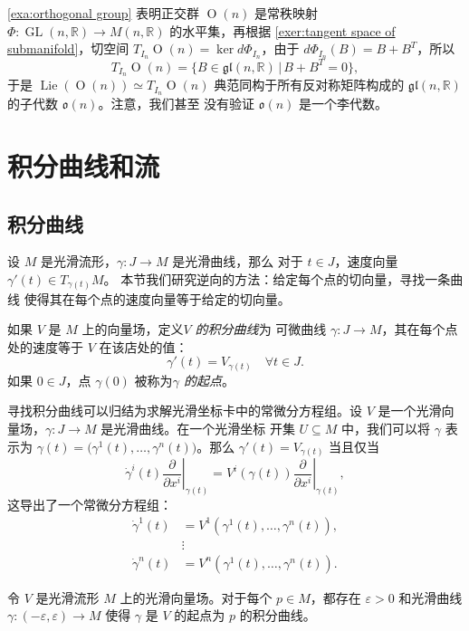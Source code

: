 \documentclass[fontset=none]{Notes}
\DeclareMathOperator\GL{GL}
\DeclareMathOperator\Orth{O}
\DeclareMathOperator\Lie{Lie}
\begin{document}
\begin{example}[$\Orth(n)$ 的李代数]
  \autoref{exa:orthogonal group} 表明正交群 $\Orth(n)$ 是常秩映射
  $\varPhi:\GL(n,\mathbb{R})\to M(n,\mathbb{R})$ 的水平集，再根据
  \autoref{exer:tangent space of submanifold}，切空间
  $T_{I_n}\Orth(n)=\ker d\varPhi_{I_n}$，由于
  $d\varPhi_{I_n}(B)=B+B^T$，所以
  \[
    T_{I_n}\Orth(n)=\{B\in \mathfrak{gl}(n,\mathbb{R})\,|\, B+B^T=0\},  
  \]
  于是 $\Lie(\Orth(n))\simeq T_{I_n}\Orth(n)$ 典范同构于所有反对称矩阵构成的
  $\mathfrak{gl}(n,\mathbb{R})$ 的子代数 $\mathfrak{o}(n)$。注意，我们甚至
  没有验证 $\mathfrak{o}(n)$ 是一个李代数。
\end{example}

\chapter{积分曲线和流}

\section{积分曲线}

设 $M$ 是光滑流形，$\gamma:J\to M$ 是光滑曲线，那么
对于 $t\in J$，速度向量 $\gamma'(t)\in T_{\gamma(t)}M$。
本节我们研究逆向的方法：给定每个点的切向量，寻找一条曲线
使得其在每个点的速度向量等于给定的切向量。

如果 $V$ 是 $M$ 上的向量场，定义\emph{$V$ 的积分曲线}为
可微曲线 $\gamma:J\to M$，其在每个点处的速度等于 $V$ 在该店处的值：
\[
  \gamma'(t)=V_{\gamma(t)}\quad \forall t\in J.  
\]
如果 $0\in J$，点 $\gamma(0)$ 被称为\emph{$\gamma$ 的起点}。

寻找积分曲线可以归结为求解光滑坐标卡中的常微分方程组。设
$V$ 是一个光滑向量场，$\gamma:J\to M$ 是光滑曲线。在一个光滑坐标
开集 $U\subseteq M$ 中，我们可以将 $\gamma$ 表示为
$\gamma(t)=\bigl(\gamma^1(t),\dots,\gamma^n(t)\bigr)$。那么
$\gamma'(t)=V_{\gamma(t)}$ 当且仅当
\[
  \dot\gamma^i(t)\left.\frac{\partial}{\partial x^i}\right|_{\gamma(t)}  
  =V^i(\gamma(t))\left.\frac{\partial}{\partial x^i}\right|_{\gamma(t)} ,
\] 
这导出了一个常微分方程组：
\begin{align*}
  \dot\gamma^1(t)
  &=V^1(\gamma^1(t),\dots,\gamma^n(t)) ,\\
  &\vdots \\
  \dot\gamma^n(t)
  &=V^n(\gamma^1(t),\dots,\gamma^n(t)).
\end{align*}

\begin{proposition}
  令 $V$ 是光滑流形 $M$ 上的光滑向量场。对于每个 $p\in M$，都存在
  $\varepsilon>0$ 和光滑曲线 $\gamma:(-\varepsilon,\varepsilon)\to M$
  使得 $\gamma$ 是 $V$ 的起点为 $p$ 的积分曲线。
\end{proposition}
\end{document}
